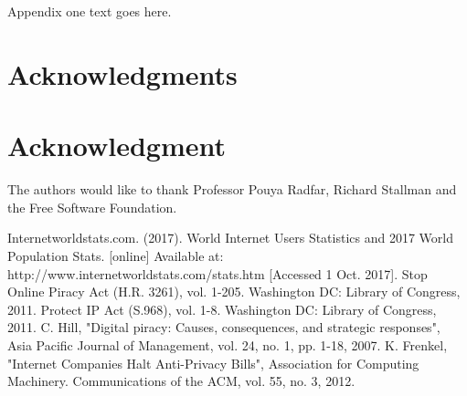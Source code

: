 \documentclass[11pt,journal,compsoc]{IEEEtran}
\begin{document}
\appendices
\section{}
Appendix one text goes here.


\ifCLASSOPTIONcompsoc
  \section*{Acknowledgments}
\else
  \section*{Acknowledgment}
\fi


The authors would like to thank Professor Pouya Radfar, Richard Stallman and the Free Software Foundation.


\ifCLASSOPTIONcaptionsoff
  \newpage
\fi




%
%
%

\begin{thebibliography}{1}

Internetworldstats.com. (2017). World Internet Users Statistics and 2017 World Population Stats. [online] Available at: 				http://www.internetworldstats.com/stats.htm [Accessed 1 Oct. 2017].
Stop Online Piracy Act (H.R. 3261), vol. 1-205. Washington DC: Library of Congress, 2011.
Protect IP Act (S.968), vol. 1-8. Washington DC: Library of Congress, 2011.
C. Hill, "Digital piracy: Causes, consequences, and strategic responses", Asia Pacific Journal of Management, vol. 24, no. 1, pp. 1-18, 2007.
K. Frenkel, "Internet Companies Halt Anti-Privacy Bills", Association for Computing Machinery. Communications of the ACM, vol. 55, no. 3, 2012.

\end{thebibliography}
\end{document}
